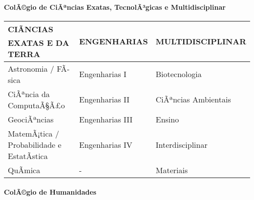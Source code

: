 \documentclass[]{article}
\let\oldparagraph\paragraph
\renewcommand{\paragraph}[1]{\oldparagraph{#1}\mbox{}}
\begin{document}
\paragraph{ColÃ©gio de CiÃªncias Exatas, TecnolÃ³gicas e
Multidisciplinar}\label{colagio-de-ciancias-exatas-tecnolagicas-e-multidisciplinar}

\begin{longtable}[]{@{}lll@{}}
\toprule
CIÃNCIAS EXATAS E DA TERRA & ENGENHARIAS &
MULTIDISCIPLINAR\tabularnewline
\midrule
\endhead
Astronomia / FÃ­sica & Engenharias I & Biotecnologia\tabularnewline
CiÃªncia da ComputaÃ§Ã£o & Engenharias II & CiÃªncias
Ambientais\tabularnewline
GeociÃªncias & Engenharias III & Ensino\tabularnewline
MatemÃ¡tica / Probabilidade e EstatÃ­stica & Engenharias IV &
Interdisciplinar\tabularnewline
QuÃ­mica & - & Materiais\tabularnewline
\bottomrule
\end{longtable}

\paragraph{ColÃ©gio de Humanidades}\label{colagio-de-humanidades}
\end{document}
